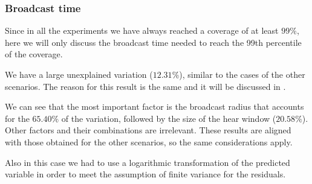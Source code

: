 \subsubsection{Broadcast time}\label{subsubsec:rect2krtime}

Since in all the experiments we have always reached a coverage of at least
\(99\%\), here we will only discuss the broadcast time needed to reach the 99th
percentile of the coverage.

We have a large unexplained variation (\(12.31\%\)), similar to the cases of the
other scenarios. The reason for this result is the same and it will be discussed
in .

We can see that the most important factor is the broadcast radius that accounts
for the \(65.40\%\) of the variation, followed by the size of the hear window
(\(20.58\%\)). Other factors and their combinations are irrelevant. These
results are aligned with those obtained for the other scenarios, so the same
considerations apply.

Also in this case we had to use a logarithmic transformation of the predicted
variable in order to meet the assumption of finite variance for the residuals.
